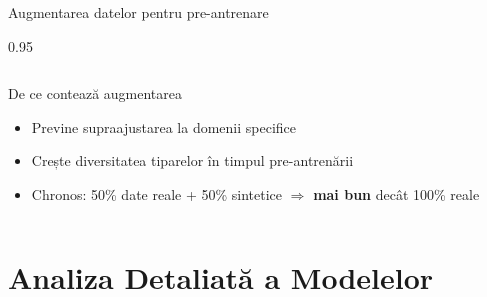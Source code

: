 \documentclass[9pt, aspectratio=169, t]{beamer}
\begin{document}
\begin{frame}{Augmentarea datelor pentru pre-antrenare}
\begin{cminipage}{0.95\textwidth}
\begin{columns}[T]
        \begin{alertblock}{De ce contează augmentarea}
            {\scriptsize
            \begin{itemize}\setlength{\itemsep}{0pt}
                \item Previne supraajustarea la domenii specifice
                \item Crește diversitatea tiparelor în timpul pre-antrenării
                \item Chronos: 50\% date reale + 50\% sintetice $\Rightarrow$ \textbf{mai bun} decât 100\% reale
            \end{itemize}
            }
        \end{alertblock}
    \end{columns}
    \end{cminipage}
\end{frame}

\section{Analiza Detaliată a Modelelor}
\end{document}
